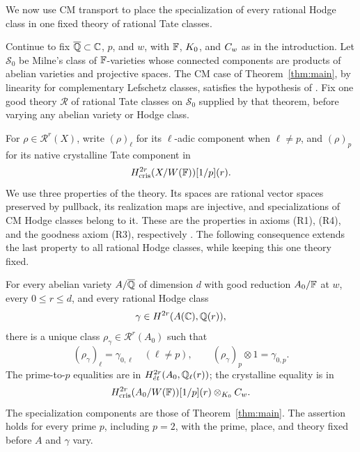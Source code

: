 We now use CM transport to place the specialization of every rational
Hodge class in one fixed theory of rational Tate classes.

Continue to fix \(\overline{\mathbb Q}\subset\mathbb C\), \(p\), and \(w\), with
\(\mathbb F\), \(K_0\), and \(C_w\) as in the introduction. Let
\(\mathcal S_0\) be Milne's class of \(\mathbb F\)-varieties whose connected
components are products of abelian varieties and projective spaces.
The CM case of Theorem~\ref{thm:main}, by linearity for complementary
Lefschetz classes, satisfies the hypothesis of
\cite[Theorem~4.5]{Milne2009}. Fix one good theory \(\mathcal R\) of
rational Tate classes on \(\mathcal S_0\) supplied by that theorem,
before varying any abelian variety or Hodge class.

For \(\rho\in\mathcal R^r(X)\), write \((\rho)_\ell\) for its
\(\ell\)-adic component when \(\ell\ne p\), and \((\rho)_p\) for
its native crystalline Tate component in
\[
 H^{2r}_{\mathrm{cris}}(X/W(\mathbb F))[1/p](r).
\]
We use three properties of the theory.  Its spaces are rational vector
spaces preserved by pullback, its realization maps are injective, and
specializations of CM Hodge classes belong to it.  These are the
properties in axioms \textup{(R1)}, \textup{(R4)}, and the goodness
axiom \textup{(R3)}, respectively
\cite[Definitions~2.1 and~3.1]{Milne2009}.  The following consequence
extends the last property to all rational Hodge classes, while keeping
this one theory fixed.

\begin{corollary}
\label{cor:all-hodge-specialization}
For every abelian variety \(A/\overline{\mathbb Q}\) of dimension \(d\) with good
reduction \(A_0/\mathbb F\) at \(w\), every \(0\leq r\leq d\), and every
rational Hodge class
\[
 \gamma\in H^{2r}(A(\mathbb C),\mathbb Q(r)),
\]
there is a unique class \(\rho_\gamma\in\mathcal R^r(A_0)\) such that
\[
 (\rho_\gamma)_\ell=\gamma_{0,\ell}\quad(\ell\ne p),\qquad
 (\rho_\gamma)_p\otimes 1=\gamma_{0,p}.
\]
The prime-to-\(p\) equalities are in
\(H^{2r}_{\acute{e}t}(A_0,\mathbb Q_\ell(r))\); the crystalline equality is in
\[
 H^{2r}_{\mathrm{cris}}(A_0/W(\mathbb F))[1/p](r)
       \otimes_{K_0}C_w.
\]
The specialization components are those of Theorem~\ref{thm:main}.
The assertion holds for every prime \(p\),
including \(p=2\), with the prime, place, and theory fixed before
\(A\) and \(\gamma\) vary.
\end{corollary}

